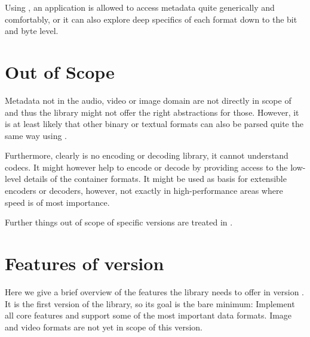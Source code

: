 Using \LibName{}, an application is allowed to access metadata quite generically and comfortably, or it can also explore deep specifics of each format down to the bit and byte level.

\section{Out of Scope}%
\label{sec:OutofScope}%

Metadata not in the audio, video or image domain are not directly in scope of \LibName{} and thus the library might not offer the right abstractions for those. However, it is at least likely that other binary or textual formats can also be parsed quite the same way using \LibName{}.

Furthermore, \LibName{} clearly is no encoding or decoding library, it cannot understand codecs. It might however help to encode or decode by providing access to the low-level details of the container formats. It might be used as basis for extensible encoders or decoders, however, not exactly in high-performance areas where speed is of most importance. 

Further things out of scope of specific versions are treated in .


\section{Features of version \LibVersion{}}
\label{sec:FeaturesLibVersion}

Here we give a brief overview of the features the library needs to offer in version \LibVersion{}. It is the first version of the library, so its goal is the bare minimum: Implement all core features and support some of the most important data formats. Image and video formats are not yet in scope of this version. 


